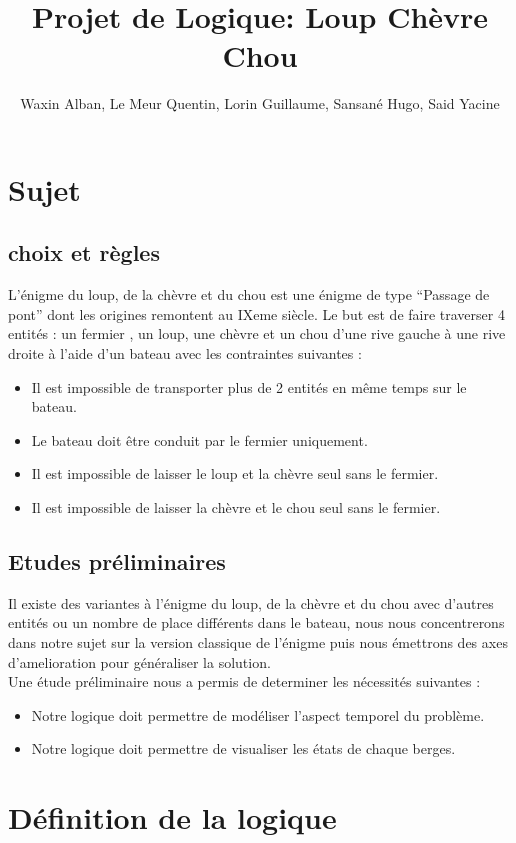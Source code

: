 \documentclass{article}
\title{Projet de Logique: Loup Chèvre Chou}
\author{Waxin Alban, Le Meur Quentin, Lorin Guillaume, Sansané Hugo, Said Yacine}
\date{}
\begin{document}
\maketitle
\tableofcontents \newpage
\section{Sujet}
\subsection{choix et règles}
L’énigme du loup, de la chèvre et du chou est une énigme de type “Passage de pont” dont les origines remontent au IXeme siècle.
Le but est de faire traverser 4 entités : un fermier , un loup, une chèvre et un chou d’une rive gauche à une rive droite à l’aide d’un bateau avec les contraintes suivantes :

\begin{itemize}
  \item  Il est impossible de transporter plus de 2 entités en même temps sur le bateau.
  \item  Le bateau doit être conduit par le fermier uniquement.
  \item  Il est impossible de laisser le loup et la chèvre seul sans le fermier.
  \item  Il est impossible de laisser la chèvre et le chou seul sans le fermier.
\end{itemize}

\subsection{Etudes préliminaires}
Il existe des variantes à l’énigme du loup, de la chèvre et du chou avec d’autres entités ou un nombre de place différents dans le bateau, nous nous concentrerons dans notre sujet sur la version classique de l’énigme puis nous émettrons des axes d’amelioration pour généraliser la solution.
\\Une étude préliminaire nous a permis de determiner les nécessités suivantes :
\begin{itemize}
  \item Notre logique doit permettre de modéliser l’aspect temporel du problème.
  \item Notre logique doit permettre de visualiser les états de chaque berges.
\end{itemize}

\section{Définition de la logique}
\end{document}
